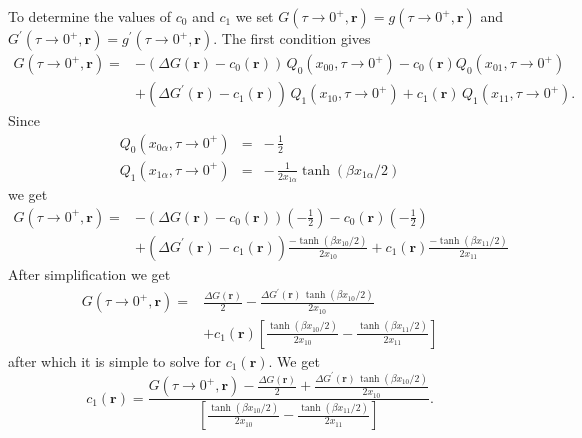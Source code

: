 To determine the values of $c_0$ and $c_1$ we
set $G(\tau \to 0^+, \mathbf{r}) = g(\tau \to 0^+, \mathbf{r})$
and $G^{\prime}(\tau \to 0^+, \mathbf{r}) = 
g^{\prime}(\tau \to 0^+, \mathbf{r})$.
The first condition gives
\begin{equation}
\begin{split}
G(\tau \to 0^+, \mathbf{r}) = &
- (\Delta G(\mathbf{r}) - c_0(\mathbf{r})) \,Q_0(x_{00},\tau \to 0^+)
 - c_0(\mathbf{r}) Q_0(x_{01}, \tau \to 0^+) \\
& +  (\Delta G^{\prime}(\mathbf{r}) - c_1(\mathbf{r})) \,Q_1(x_{10},\tau \to 0^+)
+ c_1(\mathbf{r}) \,Q_1(x_{11},\tau \to 0^+).
\end{split}
\end{equation}
Since
\begin{eqnarray}
Q_0(x_{0\alpha},\tau \to 0^+) & = & -\,\frac{1}{2} \\
Q_1(x_{1\alpha},\tau \to 0^+) & = & -\,\frac{1}{2 x_{1\alpha}}
\tanh(\beta x_{1\alpha}/2)
\end{eqnarray}
we get
\begin{equation}
\begin{split}
G(\tau \to 0^+, \mathbf{r}) = &
          - (\Delta G(\mathbf{r}) - c_0(\mathbf{r}))(-\frac{1}{2}) -
       c_0(\mathbf{r})(-\frac{1}{2}) \\
& + (\Delta G^{\prime}(\mathbf{r}) - c_1(\mathbf{r}))
\frac{- \tanh(\beta x_{10} / 2)}{2 x_{10}}
+ c_1(\mathbf{r}) \frac{- \tanh(\beta x_{11} / 2)}{2 x_{11}}
\end{split}
\end{equation}
After simplification we get
\begin{equation}
\begin{split}
G(\tau \to 0^+, \mathbf{r}) = &
\frac{\Delta G(\mathbf{r})}{2}  - \frac{\Delta G^{\prime}(\mathbf{r})
\,\tanh(\beta x_{10}/2)}{2 x_{10}} \\
& + c_1(\mathbf{r}) \left[ \frac{\tanh(\beta x_{10}/2)}{2 x_{10}}
 - \frac{\tanh(\beta x_{11}/2)}{2 x_{11}} \right]
\end{split}
\end{equation}
after which it is simple to solve for $c_1(\mathbf{r})$.   We get
\begin{equation}
c_1(\mathbf{r}) = \frac{G(\tau \to 0^+, \mathbf{r}) - 
\frac{\Delta G(\mathbf{r})}{2}
+ \frac{\Delta G^{\prime}(\mathbf{r})
\,\tanh(\beta x_{10}/2)}{2 x_{10}}}{
\left[\frac{\tanh(\beta x_{10}/2)}{2 x_{10}}
 - \frac{\tanh(\beta x_{11}/2)}{2 x_{11}} \right]}.
\end{equation} 

